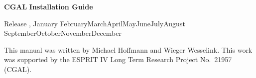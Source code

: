 
\pagestyle{empty}

\begin{titlepage}
\mbox{}
\vskip3cm
\centerline{ 
             }

\vskip2cm
\centerline{ {\Huge\bf CGAL} {\huge\bf Installation Guide} }

\vskip2cm 
\newcommand{\mydate}{\ifcase\the\month \or January\or
  February\or March\or April\or May\or June\or July\or August\or
  September\or October\or November\or December\fi \the\year}
\centerline{ {\large Release \cgalrelease, \mydate} }

\end{titlepage}

\mbox{}
\vfill
This manual was written by Michael Hoffmann and Wieger Wesselink.
\vfill
This work was supported
by the ESPRIT IV Long Term Research Project No.~21957 (CGAL).
\vskip5cm

\pagestyle{plain}
\setcounter{page}{0}
\cleardoublepage

